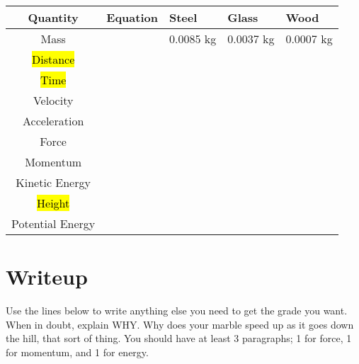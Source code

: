 \documentclass[12pt, fleqn, paper=letter]{scrartcl}
\begin{document}
\begin{table}[h]
\centering
\renewcommand{\arraystretch}{3.5}
\begin{tabularx}{\textwidth}{|c|X||X|X|X|}
\hline
\textbf{Quantity}&\hspace{10mm}\textbf{Equation}\hspace{10mm}
	&\textbf{Steel}&\textbf{Glass}&\textbf{Wood}
\\\hline
Mass && 0.0085 kg & 0.0037 kg & 0.0007 kg
\\\hline
\hl{Distance}&&&&\\\hline
\hl{Time}&&&&\\\hline
Velocity&&&&\\\hline
Acceleration&&&&\\\hline
Force&&&&\\\hline
Momentum&&&&\\\hline
Kinetic Energy&&&&\\\hline
\hl{Height}&&&&\\\hline
Potential Energy&&&&\\\hline
\end{tabularx}
\end{table}

\clearpage
\section*{Writeup}
Use the lines below to write anything else you need to get the grade you want.
When in doubt, explain WHY.
Why does your marble speed up as it goes down the hill, that sort of thing.
You should have at least 3 paragraphs; 1 for force, 1 for momentum, and 1 for energy.
\end{document}
